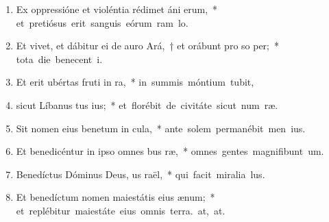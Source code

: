 \begin{flushleft}
\begin{enumerate}[leftmargin=*]
\item Ex oppressióne et violéntia rédimet áni erum,~* \mbox{et pretiósus erit sanguis eórum ram lo.}

\item Et vivet, et dábitur ei de auro Ará,~† et orábunt pro so per;~* \mbox{tota die benecent i.}

\item Et erit ubértas fruti in ra,~* \mbox{in summis móntium tubit,}

\item sicut Líbanus tus ius;~* \mbox{et florébit de civitáte sicut num ræ.}

\item Sit nomen eius benetum in cula,~* \mbox{ante solem permanébit men ius.}

\item Et benedicéntur in ipso omnes bus ræ,~* \mbox{omnes gentes magnifibunt um.}

\item Benedíctus Dóminus Deus, us raël,~* \mbox{qui facit miralia lus.}

\item Et benedíctum nomen maiestátis eius  ænum;~* \mbox{et replébitur maiestáte eius omnis terra. at, at.}

\end{enumerate}
\end{flushleft}

